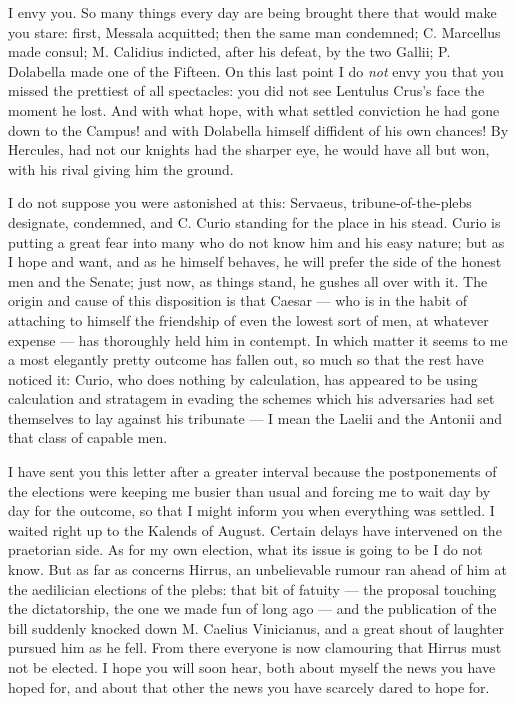 

 I envy you. So many things every day are being brought there that would make you stare: first, Messala acquitted; then the same man condemned; C. Marcellus made consul; M. Calidius indicted, after his defeat, by the two Gallii; P. Dolabella made one of the Fifteen. On this last point I do \textit{not} envy you that you missed the prettiest of all spectacles: you did not see Lentulus Crus's face the moment he lost. And with what hope, with what settled conviction he had gone down to the Campus! and with Dolabella himself diffident of his own chances! By Hercules, had not our knights had the sharper eye, he would have all but won, with his rival giving him the ground.

 I do not suppose you were astonished at this: Servaeus, tribune-of-the-plebs designate, condemned, and C. Curio standing for the place in his stead. Curio is putting a great fear into many who do not know him and his easy nature; but as I hope and want, and as he himself behaves, he will prefer the side of the honest men and the Senate; just now, as things stand, he gushes all over with it. The origin and cause of this disposition is that Caesar --- who is in the habit of attaching to himself the friendship of even the lowest sort of men, at whatever expense --- has thoroughly held him in contempt. In which matter it seems to me a most elegantly pretty outcome has fallen out, so much so that the rest have noticed it: Curio, who does nothing by calculation, has appeared to be using calculation and stratagem in evading the schemes which his adversaries had set themselves to lay against his tribunate --- I mean the Laelii and the Antonii and that class of capable men.

 I have sent you this letter after a greater interval because the postponements of the elections were keeping me busier than usual and forcing me to wait day by day for the outcome, so that I might inform you when everything was settled. I waited right up to the Kalends of August. Certain delays have intervened on the praetorian side. As for my own election, what its issue is going to be I do not know. But as far as concerns Hirrus, an unbelievable rumour ran ahead of him at the aedilician elections of the plebs: that bit of fatuity --- the proposal touching the dictatorship, the one we made fun of long ago --- and the publication of the bill suddenly knocked down M. Caelius Vinicianus, and a great shout of laughter pursued him as he fell. From there everyone is now clamouring that Hirrus must not be elected. I hope you will soon hear, both about myself the news you have hoped for, and about that other the news you have scarcely dared to hope for.

